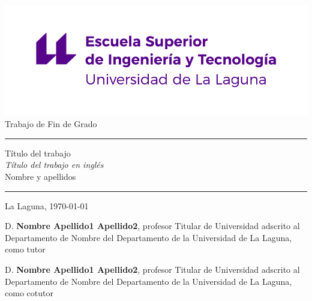 \documentclass[spanish,a4paper,12pt,oneside]{scrbook}
\begin{document}
   

\pagestyle{empty}

\newcommand{\HRule}{\rule{\linewidth}{1mm}}
\setlength{\parindent}{0mm}
\setlength{\parskip}{0mm}


\begin{center}
\includegraphics[scale=0.8]{images/escuela-ingenieria-tecnologia-original}\\[10mm]
{\Huge Trabajo de Fin de Grado}
\end{center}

\HRule
\begin{flushright}
        {\Huge Título del trabajo} \\[2.5mm]
        {\Large \textit{Título del trabajo en inglés}} \\[5mm]
        {\Large Nombre y apellidos} \\[5mm]


\end{flushright}
\HRule
{}
\begin{center}
  \Large La Laguna, \today
\end{center}

\setlength{\parindent}{5mm}

\frontmatter
{}
\thispagestyle{empty}

D. \textbf{Nombre Apellido1 Apellido2}, profesor Titular de Universidad adscrito al Departamento de Nombre del Departamento de la Universidad de La Laguna, como tutor

\bigskip
D. \textbf{Nombre Apellido1 Apellido2}, profesor Titular de Universidad adscrito al Departamento de Nombre del Departamento de la Universidad de La Laguna, como cotutor\pagestyle{empty}
\end{document}
